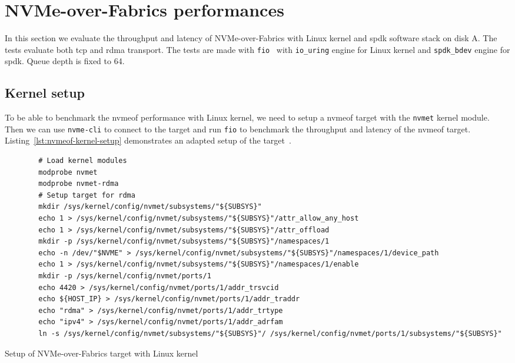 \section{NVMe-over-Fabrics performances}

    In this section we evaluate the throughput and latency of NVMe-over-Fabrics with Linux kernel and \acrshort{spdk} software stack on disk A. The tests evaluate both \acrshort{tcp} and \acrshort{rdma} transport. The tests are made with \texttt{\acrshort{fio}}~\cite{noauthor_kernelgitaxboefiogit_nodate} with \texttt{io\_uring} engine for Linux kernel and \texttt{spdk\_bdev} engine for \acrshort{spdk}. Queue depth is fixed to 64.

\subsection{Kernel setup}

    To be able to benchmark the \acrshort{nvmeof} performance with Linux kernel, we need to setup a \acrshort{nvmeof} target with the \texttt{nvmet} kernel module. Then we can use \texttt{nvme-cli} to connect to the target and run \texttt{\acrshort{fio}} to benchmark the throughput and latency of the \acrshort{nvmeof} target. Listing~\ref{lst:nvmeof-kernel-setup} demonstrates an adapted setup of the target~\cite{howto_configure_nvme_over_fabrics}.


    \begin{listing}[htbp]
        \centering
        \begin{verbatim}
        # Load kernel modules
        modprobe nvmet
        modprobe nvmet-rdma
        # Setup target for rdma
        mkdir /sys/kernel/config/nvmet/subsystems/"${SUBSYS}"
        echo 1 > /sys/kernel/config/nvmet/subsystems/"${SUBSYS}"/attr_allow_any_host
        echo 1 > /sys/kernel/config/nvmet/subsystems/"${SUBSYS}"/attr_offload
        mkdir -p /sys/kernel/config/nvmet/subsystems/"${SUBSYS}"/namespaces/1
        echo -n /dev/"$NVME" > /sys/kernel/config/nvmet/subsystems/"${SUBSYS}"/namespaces/1/device_path
        echo 1 > /sys/kernel/config/nvmet/subsystems/"${SUBSYS}"/namespaces/1/enable
        mkdir -p /sys/kernel/config/nvmet/ports/1
        echo 4420 > /sys/kernel/config/nvmet/ports/1/addr_trsvcid
        echo ${HOST_IP} > /sys/kernel/config/nvmet/ports/1/addr_traddr
        echo "rdma" > /sys/kernel/config/nvmet/ports/1/addr_trtype
        echo "ipv4" > /sys/kernel/config/nvmet/ports/1/addr_adrfam
        ln -s /sys/kernel/config/nvmet/subsystems/"${SUBSYS}"/ /sys/kernel/config/nvmet/ports/1/subsystems/"${SUBSYS}"
    \end{verbatim}
        \caption{Setup of NVMe-over-Fabrics target with Linux kernel}
        \label{lst:nvmeof-kernel-setup}
    \end{listing}
    
